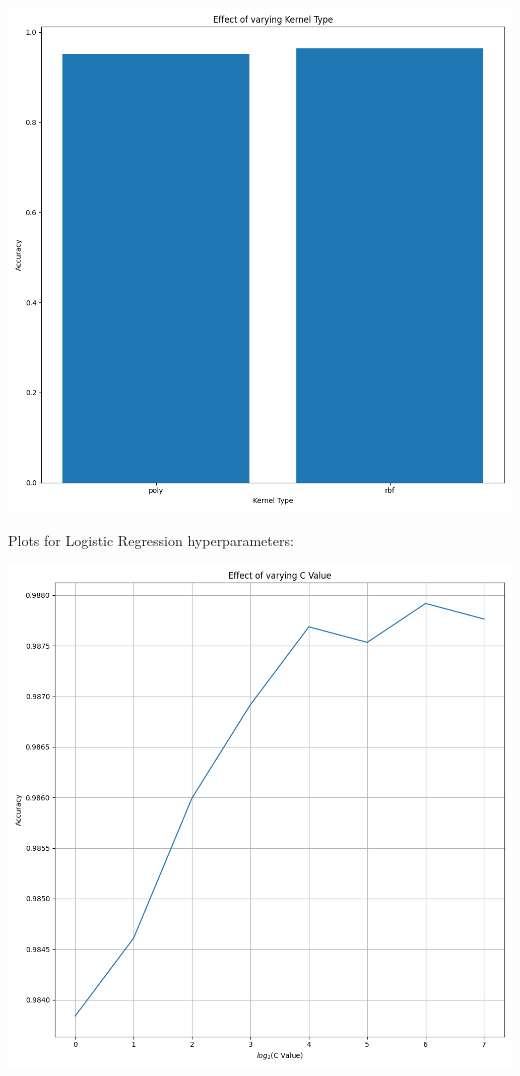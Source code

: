 \documentclass[12pt, letterpaper]{article}
\begin{document}
\includegraphics[scale=\myscale]{svc_Kernel Type.png}

Plots for Logistic Regression hyperparameters:

\includegraphics[scale=\myscale]{logistic_regression_C Value.png}
\end{document}
